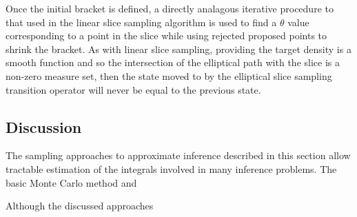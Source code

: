 Once the initial bracket is defined, a directly analagous iterative procedure to that used in the linear slice sampling algorithm is used to find a $\theta$ value corresponding to a point in the slice while using rejected proposed points to shrink the bracket. As with linear slice sampling, providing the target density is a smooth function and so the intersection of the elliptical path with the slice is a non-zero measure set, then the state moved to by the elliptical slice sampling transition operator will never be equal to the previous state.

\subsection{Discussion}

The sampling approaches to approximate inference described in this section allow tractable estimation of the integrals involved in many inference problems. The basic Monte Carlo method and 

Although the discussed approaches 











